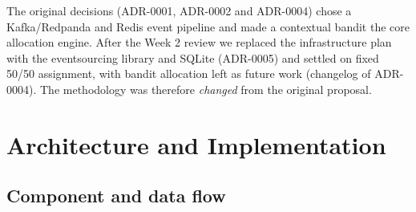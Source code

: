 \documentclass[11pt,a4paper]{article}
\renewcommand{\_}{\textunderscore\allowbreak{}}
\begin{document}
The original decisions (ADR-0001, ADR-0002 and ADR-0004) chose a Kafka/Redpanda and Redis event pipeline and made a contextual bandit the core allocation engine. After the Week 2 review we replaced the infrastructure plan with the eventsourcing library and SQLite (ADR-0005) and settled on fixed 50/50 assignment, with bandit allocation left as future work (changelog of ADR-0004). The methodology was therefore \emph{changed} from the original proposal.

\Needspace{12cm}
\section{Architecture and Implementation}

\subsection{Component and data flow}
\end{document}
